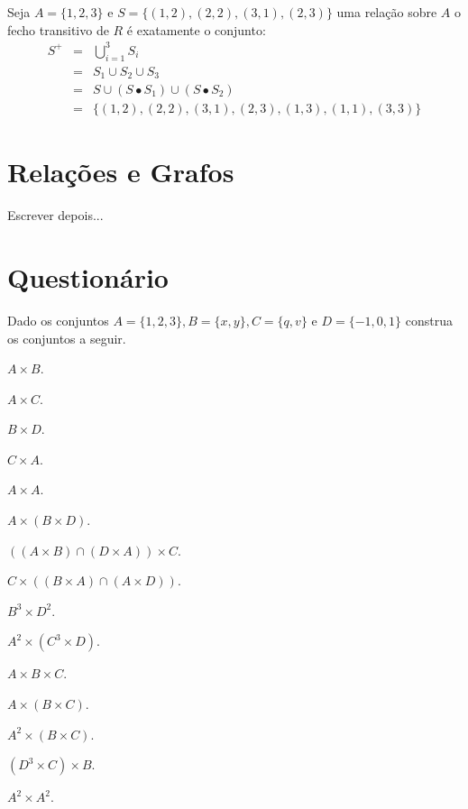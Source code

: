 \begin{exemplo}
	Seja $A = \{1, 2, 3\}$ e $S =\{(1, 2), (2, 2), (3, 1), (2, 3)\}$ uma relação sobre $A$ o fecho transitivo de $R$ é exatamente o conjunto:
	\begin{eqnarray*}
		S^+ & = & \bigcup_{i = 1}^3 S_i\\
		 & = & S_1 \cup S_2 \cup S_3\\
		 & = & S \cup (S \bullet S_1) \cup (S \bullet S_2)\\
		 & = & \{(1, 2), (2, 2), (3, 1), (2, 3), (1, 3), (1, 1), (3, 3)\}
	\end{eqnarray*}
\end{exemplo}

\section{Relações e Grafos}\label{sec:RelacoesGrafos}

{\color{red}Escrever depois...}

\section{Questionário}\label{sec:Questionario3part1}

\begin{questao}\label{prob:Relacoes1}
	Dado os conjuntos $A = \{1, 2, 3\}, B = \{x, y\}, C = \{q, v\}$ e $D = \{-1, 0, 1\}$ construa os conjuntos a seguir.
\end{questao}

\begin{exerList}
	\item $A \times B$.
	\item $A \times C$.
	\item $B \times D$.
	\item $C \times A$.
	\item $A \times A$.
	\item $A \times (B \times D)$.
	\item $((A \times B) \cap (D \times A)) \times C$.
	\item $C \times ((B \times A) \cap (A \times D))$.
	\item $B^3 \times D^2$.
	\item $A^2 \times (C^3 \times D)$.
	\item $A \times B \times C$.
	\item $A \times (B \times C)$.
	\item $A^2 \times (B \times C)$.
	\item $(D^3 \times C) \times B$.
	\item $A^2 \times A^2$.
\end{exerList}


